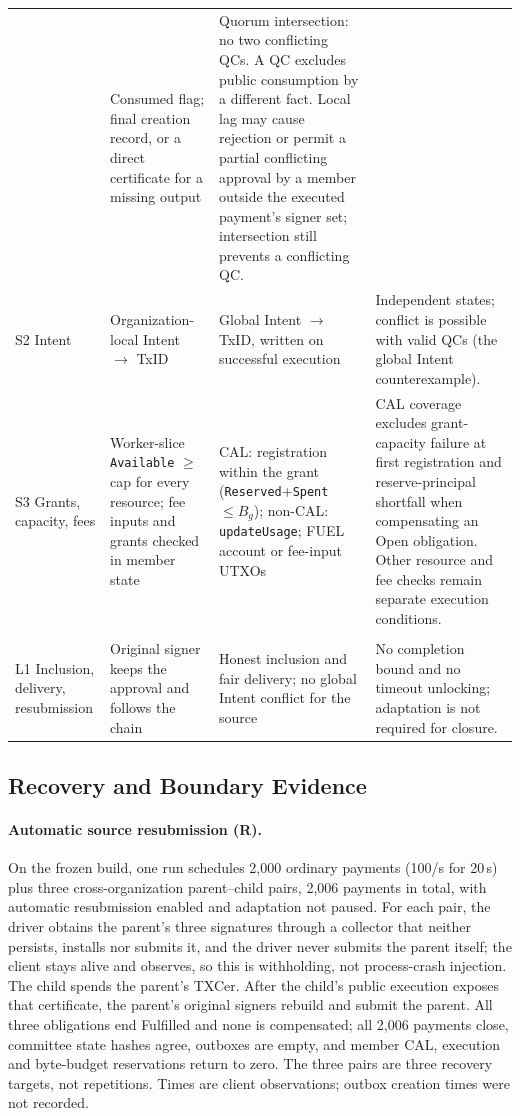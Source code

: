 \begin{longtable}{@{}>{\raggedright\arraybackslash}p{}>{\raggedright\arraybackslash}p{}>{\raggedright\arraybackslash}p{}>{\raggedright\arraybackslash}p{}@{}}
 & Consumed flag; final creation record, or a direct certificate for a missing output
 & Quorum intersection: no two conflicting QCs. A QC excludes public consumption by a different fact. Local lag may cause rejection or permit a partial conflicting approval by a member outside the executed payment's signer set; intersection still prevents a conflicting QC. \\
S2 Intent
 & Organization-local Intent $\to$ TxID
 & Global Intent $\to$ TxID, written on successful execution
 & Independent states; conflict is possible with valid QCs (the global Intent counterexample). \\
S3 Grants, capacity, fees
 & Worker-slice \texttt{Available} $\ge$ cap for every resource; fee inputs and grants checked in member state
 & CAL: registration within the grant (\texttt{Reserved}+\texttt{Spent} $\le B_g$); non-CAL: \texttt{updateUsage}; FUEL account or fee-input UTXOs
 & CAL coverage excludes grant-capacity failure at first registration and reserve-principal shortfall when compensating an Open obligation. Other resource and fee checks remain separate execution conditions. \\
\hline
\multicolumn{4}{@{}l}{\textit{L. Liveness}} \\
L1 Inclusion, delivery, resubmission
 & Original signer keeps the approval and follows the chain
 & Honest inclusion and fair delivery; no global Intent conflict for the source
 & No completion bound and no timeout unlocking; adaptation is not required for closure. \\
\hline
\end{longtable}
\endgroup


\subsection{Recovery and Boundary Evidence}
\paragraph{Automatic source resubmission (R).}
On the frozen build, one run schedules 2,000 ordinary payments (100/s for 20\,s)
plus three cross-organization parent--child pairs, 2,006 payments in total, with
automatic resubmission enabled and adaptation not paused. For each pair, the driver
obtains the parent's three signatures through a collector that neither persists,
installs nor submits it, and the driver never submits the parent itself; the client
stays alive and observes, so this is withholding, not process-crash injection. The
child spends the parent's TXCer. After the child's public execution exposes that
certificate, the parent's original signers rebuild and submit the parent. All three
obligations end Fulfilled and none is compensated; all 2,006 payments close,
committee state hashes agree, outboxes are empty, and member CAL, execution and
byte-budget reservations return to zero. The three pairs are three recovery targets,
not repetitions. Times are client observations; outbox creation times were not
recorded.

